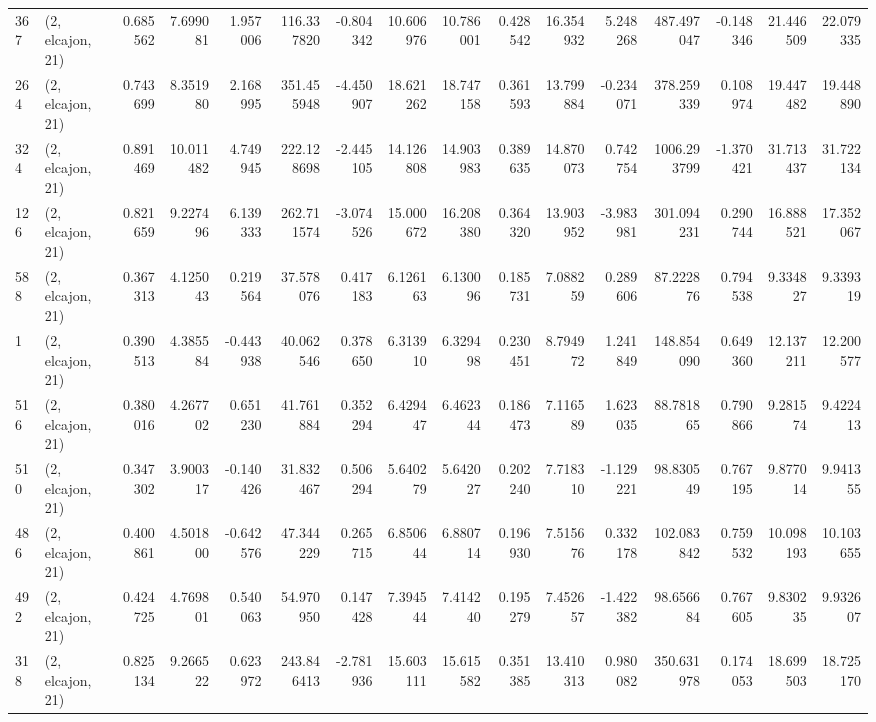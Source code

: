\begin{tabular}{llrrrrrrrrrrrrrr}
367 &  (2, elcajon, 21) &   0.685562 &   7.699081 &   1.957006 &   116.337820 &  -0.804342 &  10.606976 &  10.786001 &  0.428542 &  16.354932 &   5.248268 &    487.497047 &  -0.148346 &   21.446509 &   22.079335 \\
264 &  (2, elcajon, 21) &   0.743699 &   8.351980 &   2.168995 &   351.455948 &  -4.450907 &  18.621262 &  18.747158 &  0.361593 &  13.799884 &  -0.234071 &    378.259339 &   0.108974 &   19.447482 &   19.448890 \\
324 &  (2, elcajon, 21) &   0.891469 &  10.011482 &   4.749945 &   222.128698 &  -2.445105 &  14.126808 &  14.903983 &  0.389635 &  14.870073 &   0.742754 &   1006.293799 &  -1.370421 &   31.713437 &   31.722134 \\
126 &  (2, elcajon, 21) &   0.821659 &   9.227496 &   6.139333 &   262.711574 &  -3.074526 &  15.000672 &  16.208380 &  0.364320 &  13.903952 &  -3.983981 &    301.094231 &   0.290744 &   16.888521 &   17.352067 \\
588 &  (2, elcajon, 21) &   0.367313 &   4.125043 &   0.219564 &    37.578076 &   0.417183 &   6.126163 &   6.130096 &  0.185731 &   7.088259 &   0.289606 &     87.222876 &   0.794538 &    9.334827 &    9.339319 \\
1   &  (2, elcajon, 21) &   0.390513 &   4.385584 &  -0.443938 &    40.062546 &   0.378650 &   6.313910 &   6.329498 &  0.230451 &   8.794972 &   1.241849 &    148.854090 &   0.649360 &   12.137211 &   12.200577 \\
516 &  (2, elcajon, 21) &   0.380016 &   4.267702 &   0.651230 &    41.761884 &   0.352294 &   6.429447 &   6.462344 &  0.186473 &   7.116589 &   1.623035 &     88.781865 &   0.790866 &    9.281574 &    9.422413 \\
510 &  (2, elcajon, 21) &   0.347302 &   3.900317 &  -0.140426 &    31.832467 &   0.506294 &   5.640279 &   5.642027 &  0.202240 &   7.718310 &  -1.129221 &     98.830549 &   0.767195 &    9.877014 &    9.941355 \\
486 &  (2, elcajon, 21) &   0.400861 &   4.501800 &  -0.642576 &    47.344229 &   0.265715 &   6.850644 &   6.880714 &  0.196930 &   7.515676 &   0.332178 &    102.083842 &   0.759532 &   10.098193 &   10.103655 \\
492 &  (2, elcajon, 21) &   0.424725 &   4.769801 &   0.540063 &    54.970950 &   0.147428 &   7.394544 &   7.414240 &  0.195279 &   7.452657 &  -1.422382 &     98.656684 &   0.767605 &    9.830235 &    9.932607 \\
318 &  (2, elcajon, 21) &   0.825134 &   9.266522 &   0.623972 &   243.846413 &  -2.781936 &  15.603111 &  15.615582 &  0.351385 &  13.410313 &   0.980082 &    350.631978 &   0.174053 &   18.699503 &   18.725170 \\

\end{tabular}
